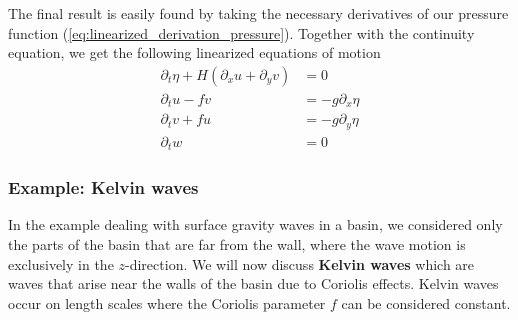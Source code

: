 \documentclass[a4paper, 12pt]{article}
\numberwithin{equation}{subsubsection}
\begin{document}
The final result is easily found by taking the necessary derivatives of our pressure function (\ref{eq:linearized_derivation_pressure}). Together with the continuity equation, we get the following linearized equations of motion
\begin{align}
	\partial_t \eta + H \left(\partial_x u + \partial_y v \right) &= 0 \label{eq:linearized_eqs_1}  \\
	\partial_t u - fv &= - g \partial_x \eta \\
	\partial_t v + fu &= - g \partial_y \eta \\
	\partial_t w &= 0 \label{eq:linearized_eqs_4} 
\end{align}

\subsubsection{Example: Kelvin waves}
In the example dealing with surface gravity waves in a basin, we considered only the parts of the basin that are far from the wall, where the wave motion is exclusively in the $z$-direction. We will now discuss \textbf{Kelvin waves} which are waves that arise near the walls of the basin due to Coriolis effects. Kelvin waves occur on length scales where the Coriolis parameter $f$ can be considered constant.
\end{document}
